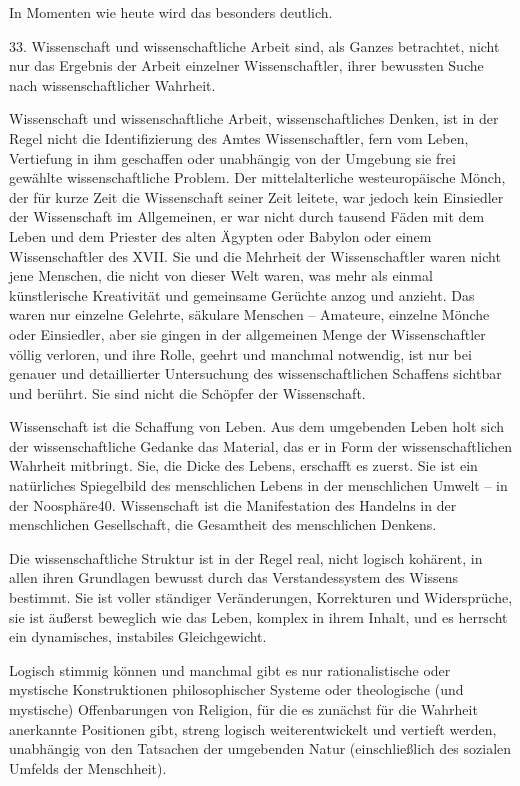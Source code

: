 \documentclass[11pt,a4paper]{book}
\begin{document}
In Momenten wie heute wird das besonders deutlich. 

33. Wissenschaft und wissenschaftliche Arbeit sind, als Ganzes betrachtet, nicht nur das Ergebnis der Arbeit einzelner Wissenschaftler, ihrer bewussten Suche nach wissenschaftlicher Wahrheit. 

Wissenschaft und wissenschaftliche Arbeit, wissenschaftliches Denken, ist in der Regel nicht die Identifizierung des Amtes Wissenschaftler, fern vom Leben, Vertiefung in ihm geschaffen oder unabhängig von der Umgebung sie frei gewählte wissenschaftliche Problem. Der mittelalterliche westeuropäische Mönch, der für kurze Zeit die Wissenschaft seiner Zeit leitete, war jedoch kein Einsiedler der Wissenschaft im Allgemeinen, er war nicht durch tausend Fäden mit dem Leben und dem Priester des alten Ägypten oder Babylon oder einem Wissenschaftler des XVII. Sie und die Mehrheit der Wissenschaftler waren nicht jene Menschen, die nicht von dieser Welt waren, was mehr als einmal künstlerische Kreativität und gemeinsame Gerüchte anzog und anzieht. Das waren nur einzelne Gelehrte, säkulare Menschen -- Amateure, einzelne Mönche oder Einsiedler, aber sie gingen in der allgemeinen Menge der Wissenschaftler völlig verloren, und ihre Rolle, geehrt und manchmal notwendig, ist nur bei genauer und detaillierter Untersuchung des wissenschaftlichen Schaffens sichtbar und berührt. Sie sind nicht die Schöpfer der Wissenschaft. 

Wissenschaft ist die Schaffung von Leben. Aus dem umgebenden Leben holt sich der wissenschaftliche Gedanke das Material, das er in Form der wissenschaftlichen Wahrheit mitbringt. Sie, die Dicke des Lebens, erschafft es zuerst. Sie ist ein natürliches Spiegelbild des menschlichen Lebens in der menschlichen Umwelt -- in der Noosphäre40. Wissenschaft ist die Manifestation des Handelns in der menschlichen Gesellschaft, die Gesamtheit des menschlichen Denkens. 

Die wissenschaftliche Struktur ist in der Regel real, nicht logisch kohärent, in allen ihren Grundlagen bewusst durch das Verstandessystem des Wissens bestimmt. Sie ist voller ständiger Veränderungen, Korrekturen und Widersprüche, sie ist äußerst beweglich wie das Leben, komplex in ihrem Inhalt, und es herrscht ein dynamisches, instabiles Gleichgewicht. 

Logisch stimmig können und manchmal gibt es nur rationalistische oder mystische Konstruktionen philosophischer Systeme oder theologische (und mystische) Offenbarungen von Religion, für die es zunächst für die Wahrheit anerkannte Positionen gibt, streng logisch weiterentwickelt und vertieft werden, unabhängig von den Tatsachen der umgebenden Natur (einschließlich des sozialen Umfelds der Menschheit). 
\end{document}
